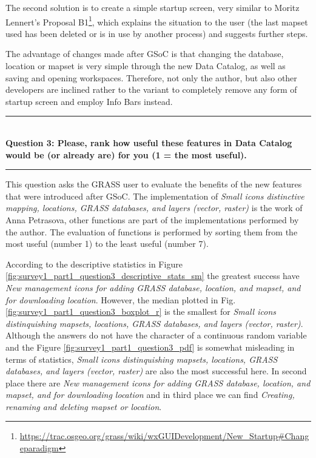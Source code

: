\documentclass[a4paper,10pt,twoside]{article}
\begin{document}
The second solution is to create a simple startup screen, very similar to Moritz Lennert's Proposal B1\footnote{\url{https://trac.osgeo.org/grass/wiki/wxGUIDevelopment/New\_Startup\#Changeparadigm}}, which explains the situation to the user (the last mapset used has been deleted or is in use by another process) and suggests further steps.

The advantage of changes made after GSoC is that changing the database, location or mapset is very simple through the new Data Catalog, as well as saving and opening workspaces. Therefore, not only the author, but also other developers are inclined rather to the variant to completely remove any form of startup screen and employ Info Bars instead.

\par\noindent\rule{\textwidth}{0.4pt} \\
\noindent \textbf{Question 3: Please, rank how useful these features in Data Catalog would be (or already are) for you (1 = the most useful).}
\par\noindent\rule{\textwidth}{0.4pt}

\noindent This question asks the GRASS user to evaluate the benefits of the new features that were introduced after GSoC. The implementation of \textit{Small icons distinctive mapping, locations, GRASS databases, and layers (vector, raster)} is the work of Anna Petrasova, other functions are part of the implementations performed by the author. The evaluation of functions is performed by sorting them from the most useful (number 1) to the least useful (number 7).

According to the descriptive statistics in Figure \ref{fig:survey1_part1_question3_descriptive_stats_sm} the greatest success have \textit{New management icons for adding GRASS database, location, and mapset, and for downloading location}. However, the median plotted in Fig. \ref{fig:survey1_part1_question3_boxplot_r} is the smallest for \textit{Small icons distinquishing mapsets, locations, GRASS databases, and layers (vector, raster)}. Although the answers do not have the character of a continuous random variable and the Figure \ref{fig:survey1_part1_question3_pdf} is somewhat misleading in terms of statistics, \textit{Small icons distinquishing mapsets, locations, GRASS databases, and layers (vector, raster) } are also the most successful here. In second place there are \textit{New management icons for adding GRASS database, location, and mapset, and for downloading location} and in third place we can find \textit{Creating, renaming and deleting mapset or location}.
\end{document}

